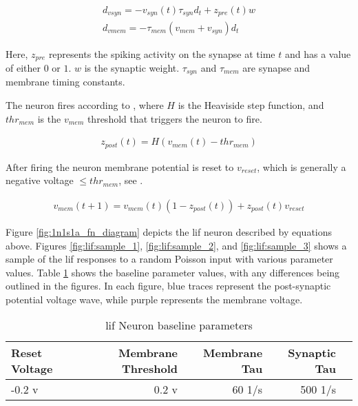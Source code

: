 \begin{align}
d_{vsyn} = -v_{syn}(t) \tau_{syn} d_t + z_{pre}(t) w \label{eq:lif:psp} \\
d_{vmem} = -\tau_{mem} (v_{mem} + v_{syn}) d_t \label{eq:lif:v}
\end{align}

Here, $z_{pre}$ represents the spiking activity on the synapse at time
$t$ and has a value of either $0$ or $1$. $w$ is the synaptic
weight. $\tau_{syn}$ and $\tau_{mem}$ are synapse and membrane timing
constants.

The neuron fires according to , where $H$ is the
Heaviside step function, and $thr_{mem}$ is the $v_{mem}$ threshold that
triggers the neuron to fire.

\begin{align}
z_{post}(t) = H(v_{mem}(t) - thr_{mem}) \label{eq:lif:fire}
\end{align}

After firing the neuron membrane potential is reset to $v_{reset}$, which is
generally a negative voltage $\leq thr_{mem}$, see .

\begin{align}
v_{mem}(t+1) = v_{mem}(t)(1 - z_{post}(t)) + z_{post}(t)v_{reset} \label{eq:lif:reset}
\end{align}

Figure \ref{fig:1n1s1a_fn_diagram} depicts the \gls{lif} neuron described by
equations above. Figures \ref{fig:lif:sample_1}, \ref{fig:lif:sample_2}, and
\ref{fig:lif:sample_3} shows a sample of the \gls{lif} responses to a random
Poisson input with various parameter values. Table \ref{table:lif_params} shows
the baseline parameter values, with any differences being outlined in the
figures. In each figure, blue traces represent the post-synaptic potential
voltage wave, while purple represents the membrane voltage.

\begin{table}[!htp]\centering
  \caption{\Gls{lif} Neuron baseline parameters} \label{table:lif_params}
  \scriptsize
  \begin{tabular}{lrrrr}\toprule
    Reset Voltage &Membrane Threshold &Membrane Tau &Synaptic Tau \\\midrule
    -0.2 v &0.2 v &60 1/s &500 1/s \\
    \bottomrule
  \end{tabular}
\end{table}


